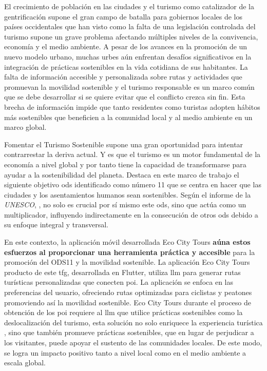 
El crecimiento de población en las ciudades \cite{nieuwenhuijsen_urban_2020} y el turismo como catalizador de la gentrificación supone el gran campo de batalla para gobiernos locales de los países occidentales que han visto como la falta de una legislación controlada del turismo supone un grave problema afectando múltiples niveles de la convivencia, economía y el medio ambiente. A pesar de los avances en la promoción de un nuevo modelo urbano, muchas urbes aún enfrentan desafíos significativos en la integración de prácticas sostenibles en la vida cotidiana de sus habitantes. La falta de información accesible y personalizada sobre rutas y actividades que promuevan la movilidad sostenible y el turismo responsable es un marco común que se debe desarrollar si se quiere evitar que el conflicto crezca sin fin. Esta brecha de información impide que tanto residentes como turistas adopten hábitos más sostenibles que beneficien a la comunidad local y al medio ambiente en un marco global.

Fomentar el Turismo Sostenible supone una gran oportunidad para intentar contrarrestar la deriva actual. Y es que el turismo es un motor fundamental de la economía a nivel global y por tanto tiene la capacidad de transformarse para ayudar a la sostenibilidad del planeta.  Destaca en este marco de trabajo el siguiente objetivo \acrshort{ods} identificado como número 11 que se centra en hacer que las ciudades y los asentamientos humanos sean sostenibles. Según el informe de la \textit{UNESCO}, \cite{ionescu_progress_2024}, no solo es crucial por sí mismo este \acrshort{ods}, sino que actúa como un multiplicador, influyendo indirectamente en la consecución de otros \acrshort{ods} debido a su enfoque integral y transversal.

En este contexto, la aplicación móvil desarrollada Eco City Tours \textbf{aúna estos esfuerzos al proporcionar una herramienta práctica y accesible} para la promoción del ODS11 y la movilidad sostenible. La aplicación Eco City Tours producto de este \acrshort{tfg}, desarrollada en Flutter, utiliza \acrfull{llm} para generar rutas turísticas personalizadas que conecten \acrfull{poi}. La aplicación se enfoca en las preferencias del usuario, ofreciendo rutas optimizadas para ciclistas y peatones promoviendo así la movilidad sostenible. Eco City Tours durante el proceso de obtención de los \acrfull{poi} requiere al \acrshort{llm} que utilice prácticas sostenibles como la deslocalización del turismo, esta solución no solo enriquece la experiencia turística \cite{mitas_tell_2023}, sino que también promueve prácticas sostenibles, que en lugar de perjudicar a los visitantes, puede apoyar el sustento de las comunidades locales. De este modo, se logra un impacto positivo tanto a nivel local como en el medio ambiente a escala global.